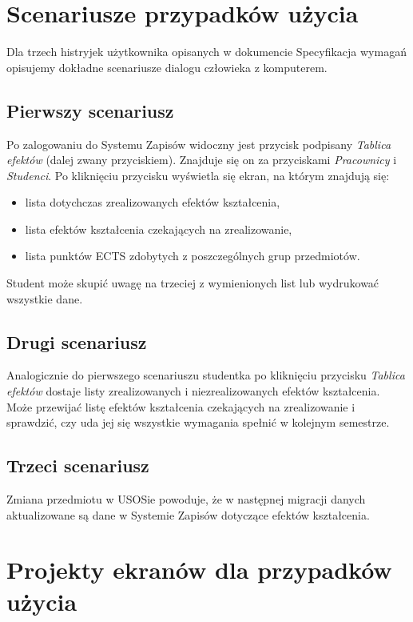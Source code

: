 \documentclass{article}
\begin{document}
\section{Scenariusze przypadków użycia}
Dla trzech histryjek użytkownika opisanych w dokumencie Specyfikacja wymagań opisujemy dokładne scenariusze dialogu człowieka z komputerem.

\subsection{Pierwszy scenariusz}
Po zalogowaniu do Systemu Zapisów widoczny jest przycisk podpisany \textit{Tablica efektów} (dalej zwany przyciskiem). 
Znajduje się on za przyciskami \textit{Pracownicy} i \textit{Studenci}. Po kliknięciu przycisku wyświetla się ekran, na którym znajdują się:
\begin{itemize}
	\item lista dotychczas zrealizowanych efektów kształcenia,
	\item lista efektów kształcenia czekających na zrealizowanie,
	\item lista punktów ECTS zdobytych z poszczególnych grup przedmiotów.
\end{itemize}
Student może skupić uwagę na trzeciej z wymienionych list lub wydrukować wszystkie dane.

\subsection{Drugi scenariusz}
Analogicznie do pierwszego scenariuszu studentka po kliknięciu przycisku \textit{Tablica efektów} dostaje listy zrealizowanych i niezrealizowanych efektów kształcenia.
Może przewijać listę efektów kształcenia czekających na zrealizowanie i sprawdzić, czy uda jej się wszystkie wymagania spełnić w kolejnym semestrze.

\subsection{Trzeci scenariusz}
Zmiana przedmiotu w USOSie powoduje, że w następnej migracji danych aktualizowane są dane w Systemie Zapisów dotyczące efektów kształcenia.

\newpage

\section{Projekty ekranów dla przypadków użycia}
\end{document}
